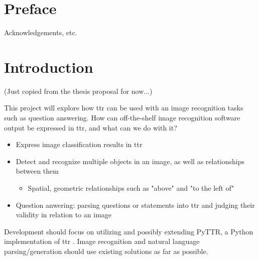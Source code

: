 \documentclass[11pt, a4paper]{article}
\begin{document}
\section*{Preface}

Acknowledgements, etc.

\thispagestyle{empty}

\newpage

\begin{spacing}{0.0}
\tableofcontents
\end{spacing}

\thispagestyle{empty}

\newpage
\setcounter{page}{1}

\section{Introduction}
\label{sec:intro}

(Just copied from the thesis proposal for now...)

This project will explore how \gls{ttr} can be used with an image recognition tasks such as question answering.
How can off-the-shelf image recognition software output be expressed in \gls{ttr}, and what can we do with it?

\begin{itemize}
\item Express image classification results in \gls{ttr}
\item Detect and recognize multiple objects in an image, as well as relationships between them
\begin{itemize}
\item Spatial, geometric relationships such as "above" and "to the left of"
\end{itemize}
\item Question anwering: parsing questions or statements into \gls{ttr} and judging their validity in relation to an image
\end{itemize}

\noindent
Development should focus on utilizing and possibly extending PyTTR, a Python implementation of \gls{ttr} \citep{pyttr}. Image recognition and natural language parsing/generation should use existing solutions as far as possible.
\end{document}
